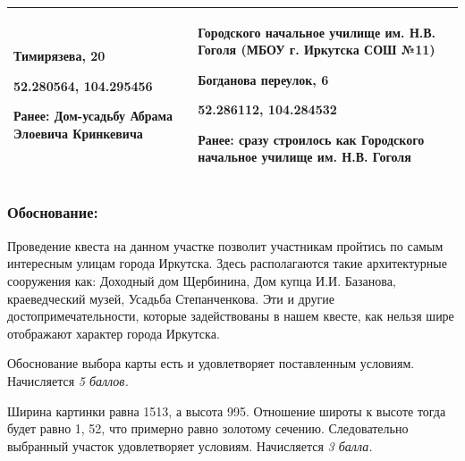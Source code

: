 \begin{tabular}{|p{8cm}|p{8cm}|}
    Тимирязева, 20
    
    52.280564, 104.295456 

    Ранее: Дом-усадьбу Абрама Элоевича Кринкевича & Городского начальное училище им. Н.В. Гоголя (МБОУ г. Иркутска СОШ №11)
    
    Богданова переулок, 6 

    52.286112, 104.284532
    
    Ранее: сразу строилось как Городского начальное училище им. Н.В. Гоголя \\
    \hline    
\end{tabular}

\subsubsection*{Обоснование:}

Проведение квеста на данном участке позволит участникам пройтись по самым интересным улицам города Иркутска. Здесь располагаются такие архитектурные сооружения как:  Доходный дом Щербинина, Дом купца И.И. Базанова, краеведческий музей, Усадьба Степанченкова. Эти и другие достопримечательности, которые задействованы в нашем квесте, как нельзя шире отображают характер города Иркутска. 


\markSection

Обоснование выбора карты есть и удовлетворяет поставленным условиям. Начисляется \textit{5 баллов.}

Ширина картинки равна 1513, а высота 995. Отношение широты к высоте тогда будет равно 1, 52, что примерно равно золотому сечению. Следовательно выбранный участок удовлетворяет условиям. Начисляется \textit{3 балла.}